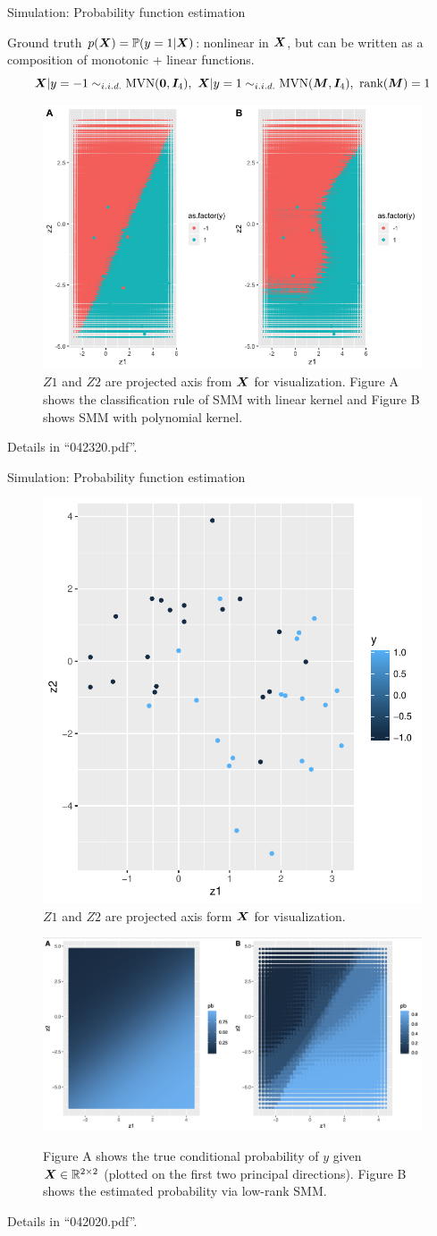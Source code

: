 \documentclass[compress,dvipsnames]{beamer}
\begin{document}
\begin{frame}{Simulation: Probability function estimation}

Ground truth $p(\bm{X})=\mathbb{P}(y=1|\bm{X})$: nonlinear in $\bm{X}$, but can be written as a composition of monotonic  + linear functions.
\[ 
\bm{X}|y=-1 \sim_{i.i.d.} \text{MVN}(\mathbf{0},\bm{I}_4), \ \bm{X}|y=1\sim_{i.i.d.} \text{MVN}(\bm{M}, \bm{I}_4),\ \text{rank}(\bm{M})=1
\]

\begin{figure}[H]
\centering
\includegraphics[width=.5\textwidth]{SMMK3.png}
\caption{\small $Z1$ and $Z2$ are projected axis from $\bm{X}$ for visualization. Figure A shows the classification rule of SMM with linear kernel and Figure B shows SMM with polynomial kernel.}
\end{figure}
\vspace{-.5cm}
{\scriptsize Details in ``042320.pdf''.}
\end{frame}


\begin{frame}{Simulation: Probability function estimation}
\begin{figure}[H]
\centering
\includegraphics[width=.2\textwidth]{realization.pdf}
\caption{\scriptsize $Z1$ and $Z2$ are projected axis form $\bm{X}$ for visualization.}
\end{figure}

\vspace{-.5cm}
\begin{figure}
    \centering
    \includegraphics[width = 6 cm]{condpb.png}
    \label{fig:my_label}
    \caption{\scriptsize Figure A shows the true conditional probability of $y$ given $\bm{X}\in\mathbb{R}^{2\times 2}$ (plotted on the first two principal directions). Figure B shows the estimated probability via low-rank SMM. }
\end{figure}
\vspace{-.5cm}
{\scriptsize Details in ``042020.pdf''.}
\end{frame}
\end{document}
